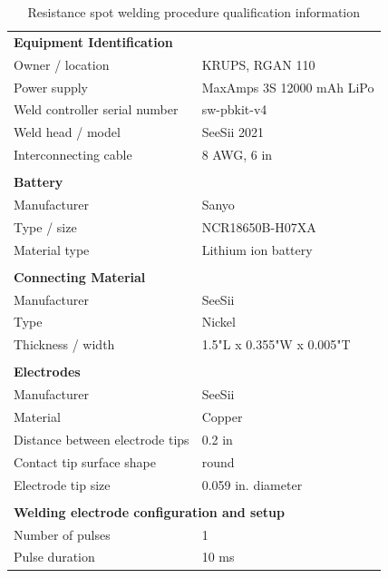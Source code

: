 \documentclass{article}
\begin{document}
\begin{table}
\centering
\caption{Resistance spot welding procedure qualification information}
\label{tab:weldequip}
\begin{tabular}{|l l|}
\hline
\multicolumn{2}{|l|}{\textbf{Equipment Identification}} \\
Owner / location &  KRUPS, RGAN 110 \\
Power supply & MaxAmps 3S 12000 mAh LiPo \\
Weld controller serial number & sw-pbkit-v4 \\
Weld head / model & SeeSii 2021 \\
Interconnecting cable & 8 AWG, 6 in \\
&\\
\hline
\multicolumn{2}{|l|}{\textbf{Battery}} \\
Manufacturer & Sanyo \\
Type / size & NCR18650B-H07XA \\
Material type & Lithium ion battery \\
&\\
\hline
\multicolumn{2}{|l|}{\textbf{Connecting Material}} \\
Manufacturer & SeeSii \\
Type & Nickel \\
Thickness / width & 1.5"L x 0.355"W x 0.005"T \\
&\\
\hline
\multicolumn{2}{|l|}{\textbf{Electrodes}} \\
Manufacturer & SeeSii \\
Material & Copper \\
Distance between electrode tips & 0.2 in \\
Contact tip surface shape & round \\
Electrode tip size & 0.059 in. diameter\\
&\\
\hline
\multicolumn{2}{|l|}{\textbf{Welding electrode configuration and setup}} \\
Number of pulses &  1 \\
Pulse duration & 10 ms \\
\hline
\end{tabular}
\end{table}
\end{document}

